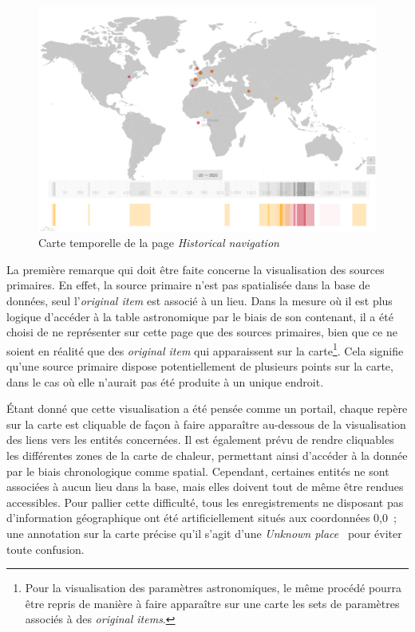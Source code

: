 \documentclass[a4paper,12pt,twoside]{book}
\newcommand{\eng}{\emph}
\newcommand{\oi}{\eng{original item}\xspace}
\newcommand{\ois}{\eng{original items}\xspace}
\newcommand{\bdd}{base de données\xspace}
\newcommand{\g}[1]{\og#1~\fg}
\begin{document}
\begin{figure}[h!]
	\centering
	\includegraphics[width=16cm]{Images/Visualisations/Historical_navigation-All.png}
	\caption{Carte temporelle de la page \eng{Historical navigation}}
\end{figure}

La première remarque qui doit être faite concerne la visualisation des sources primaires. En effet, la source primaire n'est pas spatialisée dans la \bdd, seul l'\oi est associé à un lieu. Dans la mesure où il est plus logique d'accéder à la table astronomique par le biais de son contenant, il a été choisi de ne représenter sur cette page que des sources primaires, bien que ce ne soient en réalité que des \oi qui apparaissent sur la carte\footnote{Pour la visualisation des paramètres astronomiques, le même procédé pourra être repris de manière à faire apparaître sur une carte les sets de paramètres associés à des \ois.}. Cela signifie qu'une source primaire dispose potentiellement de plusieurs points sur la carte, dans le cas où elle n'aurait pas été produite à un unique endroit.

Étant donné que cette visualisation a été pensée comme un portail, chaque repère sur la carte est cliquable de façon à faire apparaître au-dessous de la visualisation des liens vers les entités concernées. Il est également prévu de rendre cliquables les différentes zones de la carte de chaleur, permettant ainsi d'accéder à la donnée par le biais chronologique comme spatial. Cependant, certaines entités ne sont associées à aucun lieu dans la base, mais elles doivent tout de même être rendues accessibles. Pour pallier cette difficulté, tous les enregistrements ne disposant pas d'information géographique ont été artificiellement situés aux coordonnées 0,0~; une annotation sur la carte précise qu'il s'agit d'une \g{\eng{Unknown place}} pour éviter toute confusion.
\end{document}
